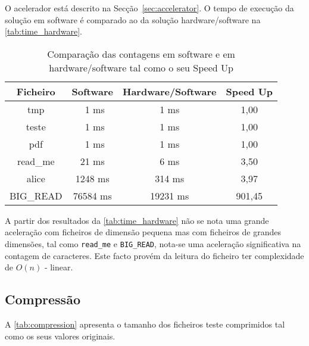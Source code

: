   O acelerador está descrito na Secção~\ref{sec:accelerator}. O tempo de execução da solução em software é comparado ao da solução hardware/software na \autoref{tab:time_hardware}.


  \begin{table}[H]
    \centering
    \caption{Comparação das contagens em software e em \\hardware/software tal como o seu Speed Up}

    \begin{tabular}{|c|c|c|c|}
      \hline
      \textbf{Ficheiro}            &
      \textbf{Software}            &
      \textbf{Hardware/Software}   &
      \textbf{Speed Up}\\ \hline \hline
      tmp        & \ 1 ms     & 1 ms     & 1,00   \\ \hline
      teste      & \ 1 ms     & 1 ms     & 1,00   \\ \hline
      pdf        & \ 1 ms     & 1 ms     & 1,00   \\ \hline
      read\_me   & 21 ms      & 6 ms     & 3,50   \\ \hline
      alice      & 1248 ms    & 314 ms   & 3,97   \\ \hline
      BIG\_READ  & 76584 ms   & 19231 ms & 901,45 \\
      \hline
    \end{tabular}
    \label{tab:time_hardware}
  \end{table}

  A partir dos resultados da \autoref{tab:time_hardware} não se nota uma grande aceleração com ficheiros de dimensão pequena mas com ficheiros de grandes dimensões, tal como \texttt{read\_me} e \texttt{BIG\_READ}, nota-se uma aceleração significativa na contagem de caracteres. Este facto provém da leitura do ficheiro ter complexidade de $O(n)$ - linear.

  \subsection{Compressão}

  A \autoref{tab:compression} apresenta o tamanho dos ficheiros teste comprimidos tal como os seus valores originais.

